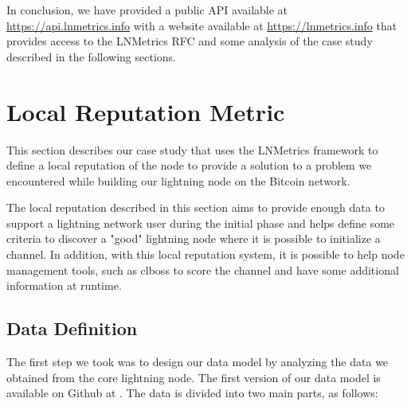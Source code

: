 In conclusion, we have provided a public API available at \url{https://api.lnmetrics.info} 
with a website available at \url{https://lnmetrics.info} that provides access to the 
LNMetrics RFC and some analysis of the case study described in the 
following sections.

\section{Local Reputation Metric}
\label{sec:demo}

This section describes our case study that uses the LNMetrics framework 
to define a local reputation of the node to provide a solution to a
problem we encountered while building our lightning node on the
Bitcoin network.

The local reputation described in this section aims to provide enough 
data to support a lightning network user during the initial phase and
helps define some criteria to discover a "good" lightning node where 
it is possible to initialize a channel. In addition, with this local 
reputation system, it is possible to help node management tools, such as
clboss \cite{clboss} to score the channel and have some additional 
information at runtime.


\subsection{Data Definition}
\label{sec:data_definition_datadef}

The first step we took was to design our data model by analyzing the data we 
obtained from the core lightning node. The first version of our data model is 
available on Github at \cite{lnmetrics_localreputation}. The data is divided 
into two main parts, as follows:

